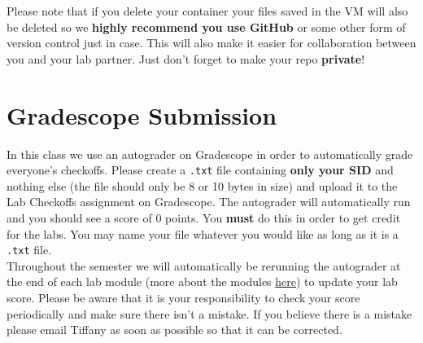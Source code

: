 \documentclass{article}
\begin{document}
Please note that if you delete your container your files saved in the VM will also be deleted so we \textbf{highly recommend you use GitHub} or some other form of version control just in case. This will also make it easier for collaboration between you and your lab partner. Just don't forget to make your repo \textbf{private}!

\section{Gradescope Submission}
In this class we use an autograder on Gradescope in order to automatically grade everyone's checkoffs. Please create a \verb=.txt= file containing \textbf{only your SID} and nothing else (the file should only be 8 or 10 bytes in size) and upload it to the Lab Checkoffs assignment on Gradescope. The autograder will automatically run and you should see a score of 0 points. You \textbf{must} do this in order to get credit for the labs. You may name your file whatever you would like as long as it is a \verb=.txt= file.\\

Throughout the semester we will automatically be rerunning the autograder at the end of each lab module (more about the modules \href{https://ucb-ee106.github.io/106a-fa20site/policies/#labs}{here}) to update your lab score. Please be aware that it is your responsibility to check your score periodically and make sure there isn't a mistake. If you believe there is a mistake please email Tiffany as soon as possible so that it can be corrected.
\end{document}
